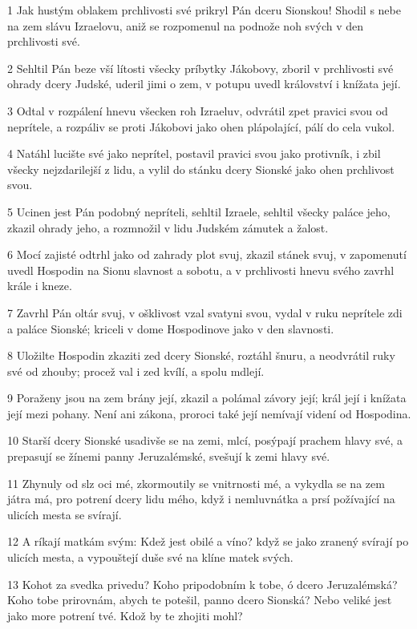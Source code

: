\par 1 Jak hustým oblakem prchlivosti své prikryl Pán dceru Sionskou! Shodil s nebe na zem slávu Izraelovu, aniž se rozpomenul na podnože noh svých v den prchlivosti své.
\par 2 Sehltil Pán beze vší lítosti všecky príbytky Jákobovy, zboril v prchlivosti své ohrady dcery Judské, uderil jimi o zem, v potupu uvedl království i knížata její.
\par 3 Odtal v rozpálení hnevu všecken roh Izraeluv, odvrátil zpet pravici svou od neprítele, a rozpáliv se proti Jákobovi jako ohen plápolající, pálí do cela vukol.
\par 4 Natáhl lucište své jako neprítel, postavil pravici svou jako protivník, i zbil všecky nejzdarilejší z lidu, a vylil do stánku dcery Sionské jako ohen prchlivost svou.
\par 5 Ucinen jest Pán podobný nepríteli, sehltil Izraele, sehltil všecky paláce jeho, zkazil ohrady jeho, a rozmnožil v lidu Judském zámutek a žalost.
\par 6 Mocí zajisté odtrhl jako od zahrady plot svuj, zkazil stánek svuj, v zapomenutí uvedl Hospodin na Sionu slavnost a sobotu, a v prchlivosti hnevu svého zavrhl krále i kneze.
\par 7 Zavrhl Pán oltár svuj, v ošklivost vzal svatyni svou, vydal v ruku neprítele zdi a paláce Sionské; kriceli v dome Hospodinove jako v den slavnosti.
\par 8 Uložilte Hospodin zkaziti zed dcery Sionské, roztáhl šnuru, a neodvrátil ruky své od zhouby; procež val i zed kvílí, a spolu mdlejí.
\par 9 Poraženy jsou na zem brány její, zkazil a polámal závory její; král její i knížata její mezi pohany. Není ani zákona, proroci také její nemívají videní od Hospodina.
\par 10 Starší dcery Sionské usadivše se na zemi, mlcí, posýpají prachem hlavy své, a prepasují se žínemi panny Jeruzalémské, svešují k zemi hlavy své.
\par 11 Zhynuly od slz oci mé, zkormoutily se vnitrnosti mé, a vykydla se na zem játra má, pro potrení dcery lidu mého, když i nemluvnátka a prsí požívající na ulicích mesta se svírají.
\par 12 A ríkají matkám svým: Kdež jest obilé a víno? když se jako zranený svírají po ulicích mesta, a vypouštejí duše své na klíne matek svých.
\par 13 Kohot za svedka privedu? Koho pripodobním k tobe, ó dcero Jeruzalémská? Koho tobe prirovnám, abych te potešil, panno dcero Sionská? Nebo veliké jest jako more potrení tvé. Kdož by te zhojiti mohl?
